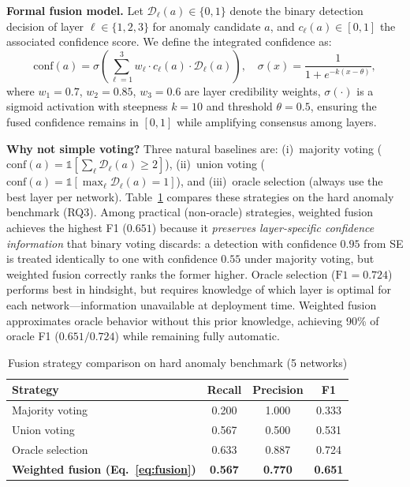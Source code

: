 \documentclass[research]{fcs}
\begin{document}
\textbf{Formal fusion model.} Let $\mathcal{D}_\ell(a) \in \{0, 1\}$ denote the binary detection decision of layer $\ell \in \{1, 2, 3\}$ for anomaly candidate $a$, and $c_\ell(a) \in [0, 1]$ the associated confidence score. We define the integrated confidence as:
\begin{equation}
\text{conf}(a) = \sigma\!\left(\sum_{\ell=1}^{3} w_\ell \cdot c_\ell(a) \cdot \mathcal{D}_\ell(a)\right),
\quad \sigma(x) = \frac{1}{1 + e^{-k(x - \theta)}},
\label{eq:fusion}
\end{equation}
where $w_1 = 0.7$, $w_2 = 0.85$, $w_3 = 0.6$ are layer credibility weights, $\sigma(\cdot)$ is a sigmoid activation with steepness $k = 10$ and threshold $\theta = 0.5$, ensuring the fused confidence remains in $[0, 1]$ while amplifying consensus among layers.

\textbf{Why not simple voting?} Three natural baselines are: (i)~majority voting ($\text{conf}(a) = \mathbb{1}[\sum_\ell \mathcal{D}_\ell(a) \geq 2]$), (ii)~union voting ($\text{conf}(a) = \mathbb{1}[\max_\ell \mathcal{D}_\ell(a) = 1]$), and (iii)~oracle selection (always use the best layer per network). Table~\ref{tab:fusion_comparison} compares these strategies on the hard anomaly benchmark (RQ3). Among practical (non-oracle) strategies, weighted fusion achieves the highest F1 ($0.651$) because it \emph{preserves layer-specific confidence information} that binary voting discards: a detection with confidence $0.95$ from SE is treated identically to one with confidence $0.55$ under majority voting, but weighted fusion correctly ranks the former higher. Oracle selection ($\text{F1} = 0.724$) performs best in hindsight, but requires knowledge of which layer is optimal for each network---information unavailable at deployment time. Weighted fusion approximates oracle behavior without this prior knowledge, achieving 90\% of oracle F1 ($0.651 / 0.724$) while remaining fully automatic.

\begin{table}[htbp]
\centering
\footnotesize
\caption{Fusion strategy comparison on hard anomaly benchmark (5 networks)}
\label{tab:fusion_comparison}
\begin{tabular}{@{}lccc@{}}
\toprule
Strategy & Recall & Precision & F1 \\
\midrule
Majority voting & 0.200 & 1.000 & 0.333 \\
Union voting & 0.567 & 0.500 & 0.531 \\
Oracle selection & 0.633 & 0.887 & 0.724 \\
\textbf{Weighted fusion (Eq.~\ref{eq:fusion})} & \textbf{0.567} & \textbf{0.770} & \textbf{0.651} \\
\bottomrule
\end{tabular}
\end{table}
\end{document}
